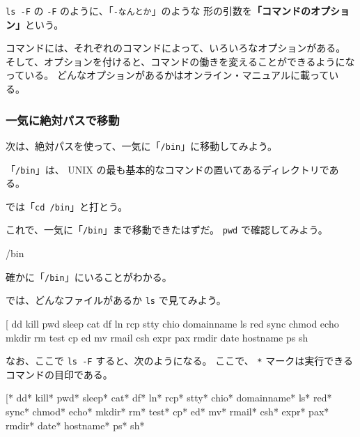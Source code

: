  \texttt{ls -F} の \texttt{-F} のように、「\texttt{-なんとか}」のような
形の引数を\textbf{「コマンドのオプション」}という。

コマンドには、それぞれのコマンドによって、いろいろなオプションがある。
そして、オプションを付けると、コマンドの働きを変えることができるようになっている。
どんなオプションがあるかはオンライン・マニュアルに載っている。

\subsubsection{一気に絶対パスで移動}

次は、絶対パスを使って、一気に「\texttt{/bin}」に移動してみよう。

「\texttt{/bin}」は、 UNIX の最も基本的なコマンドの置いてあるディレクトリである。

では「\texttt{cd /bin}」と打とう。

\begin{progls}
%
\end{progls}

これで、一気に「\texttt{/bin}」まで移動できたはずだ。
 \texttt{pwd} で確認してみよう。

\begin{progls}
/bin
%
\end{progls}

確かに「\texttt{/bin}」にいることがわかる。

では、どんなファイルがあるか \texttt{ls} で見てみよう。

\begin{progls}
[               dd              kill            pwd             sleep
cat             df              ln              rcp             stty
chio            domainname      ls              red             sync
chmod           echo            mkdir           rm              test
cp              ed              mv              rmail
csh             expr            pax             rmdir
date            hostname        ps              sh
%
\end{progls}

なお、ここで \texttt{ls -F} すると、次のようになる。
ここで、 \texttt{*} マークは実行できるコマンドの目印である。

\begin{progls}
[*              dd*             kill*           pwd*            sleep*
cat*            df*             ln*             rcp*            stty*
chio*           domainname*     ls*             red*            sync*
chmod*          echo*           mkdir*          rm*             test*
cp*             ed*             mv*             rmail*
csh*            expr*           pax*            rmdir*
date*           hostname*       ps*             sh*
%
\end{progls}

